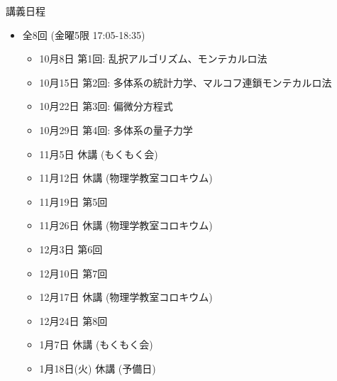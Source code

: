 \begin{frame}[t]{講義日程}
  \begin{itemize}
  \item 全8回 (金曜5限 {\color{red}17:05}-18:35)
    \begin{itemize}
    \item {\color{gray} 10月8日 第1回: 乱択アルゴリズム、モンテカルロ法}
    \item {\color{gray} 10月15日 第2回: 多体系の統計力学、マルコフ連鎖モンテカルロ法}
    \item {\color{gray} 10月22日 第3回: 偏微分方程式}
    \item 10月29日 第4回: 多体系の量子力学
    \item 11月5日 休講 (もくもく会)
    \item {\color{gray} 11月12日 休講 (物理学教室コロキウム)}
    \item 11月19日 第5回
    \item {\color{gray} 11月26日 休講 (物理学教室コロキウム)}
    \item 12月3日 第6回
    \item 12月10日 第7回
    \item {\color{gray} 12月17日 休講 (物理学教室コロキウム)}
    \item 12月24日 第8回
    \item 1月7日 休講 (もくもく会)
    \item {\color{gray} 1月18日(火) 休講 (予備日)}
    \end{itemize}
  \end{itemize}
\end{frame}
